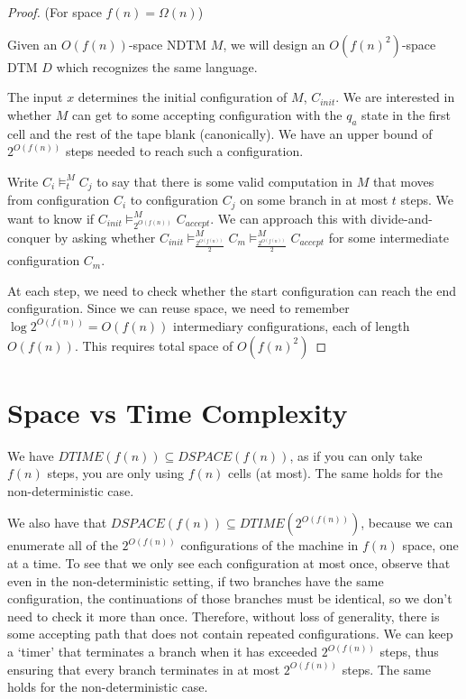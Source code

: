 \begin{proof}
	
	
	(For space $f(n)=\Omega(n)$)
	
	Given an $O(f(n))$-space NDTM $M$, we will design an $O(f(n)^2)$-space DTM $D$ which recognizes the same language.
	
	The input $x$ determines the initial configuration of $M$, $C_{init}$.  We are interested in whether $M$ can get to some accepting configuration with the $q_a$ state in the first cell and the rest of the tape blank (canonically).  We have an upper bound of $2^{O(f(n))}$ steps needed to reach such a configuration.
	
	Write $C_i \vDash^M_t C_j$ to say that there is some valid computation in $M$ that moves from configuration $C_i$ to configuration $C_j$ on some branch in at most $t$ steps.  We want to know if $C_{init} \vDash^M_{2^{O(f(n))}}C_{accept}$.  We can approach this with divide-and-conquer by asking whether $C_{init} \vDash^M_{\frac{2^{O(f(n))}}{2}}C_{m} \vDash^M_{\frac{2^{O(f(n))}}{2}}C_{accept}$ for some intermediate configuration $C_m$.
	
	At each step, we need to check whether the start configuration can reach the end configuration.  Since we can reuse space, we need to remember $\log2^{O(f(n))} = O(f(n))$ intermediary configurations, each of length $O(f(n))$.  This requires total space of $O(f(n)^2)$
	
	
\end{proof}



\section*{Space vs Time Complexity}

We have $DTIME(f(n))\subseteq DSPACE(f(n))$, as if you can only take $f(n)$ steps, you are only using $f(n)$ cells (at most).  The same holds for the non-deterministic case.

We also have that $DSPACE(f(n))\subseteq DTIME(2^{O(f(n))})$, because we can enumerate all of the $2^{O(f(n))}$ configurations of the machine in $f(n)$ space, one at a time.  To see that we only see each configuration at most once, observe that even in the non-deterministic setting, if two branches have the same configuration, the continuations of those branches must be identical, so we don't need to check it more than once.  Therefore, without loss of generality, there is some accepting path that does not contain repeated configurations.  We can keep a `timer' that terminates a branch when it has exceeded $2^{O(f(n))}$ steps, thus ensuring that every branch terminates in at most $2^{O(f(n))}$ steps.  The same holds for the non-deterministic case.

